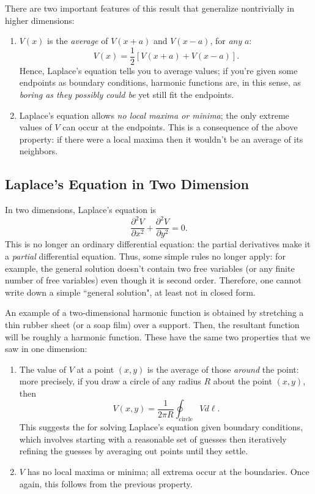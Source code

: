 There are two important features of this result that generalize nontrivially in higher dimensions:
\begin{enumerate}
    \item $V(x)$ is the \textit{average} of $V(x+a)$ and $V(x-a)$, for \textit{any} $a$:
    \[V(x)=\frac{1}{2}[V(x+a)+V(x-a)].\]
    Hence, Laplace's equation tells you to average values; if you're given some endpoints as boundary conditions, harmonic functions are, in this sense, as \textit{boring as they possibly could be} yet still fit the endpoints.
    \item Laplace's equation allows \textit{no local maxima or minima}; the only extreme values of $V$ can occur at the endpoints. This is a consequence of the above property: if there were a local maxima then it wouldn't be an average of its neighbors.
\end{enumerate}

\subsection{Laplace's Equation in Two Dimension}

In two dimensions, Laplace's equation is
\[\frac{\partial^2V}{\partial x^2}+\frac{\partial^2V}{\partial y^2}=0.\]
This is no longer an ordinary differential equation: the partial derivatives make it a \textit{partial} differential equation. Thus, some simple rules no longer apply: for example, the general solution doesn't contain two free variables (or any finite number of free variables) even though it is second order. Therefore, one cannot write down a simple ``general solution", at least not in closed form.

An example of a two-dimensional harmonic function is obtained by stretching a thin rubber sheet (or a soap film) over a support. Then, the resultant function will be roughly a harmonic function. These have the same two properties that we saw in one dimension:

\begin{enumerate}
    \item The value of $V$ at a point $(x,y)$ is the average of those \textit{around} the point: more precisely, if you draw a circle of any radius $R$ about the point $(x,y)$, then 
    \[V(x,y)=\frac{1}{2\pi R}\oint_{\text{circle}}Vd\ell.\]
    This suggests the  for solving Laplace's equation given boundary conditions, which involves starting with a reasonable set of guesses then iteratively refining the guesses by averaging out points until they settle.
    \item $V$ has no local maxima or minima; all extrema occur at the boundaries. Once again, this follows from the previous property.
\end{enumerate}


